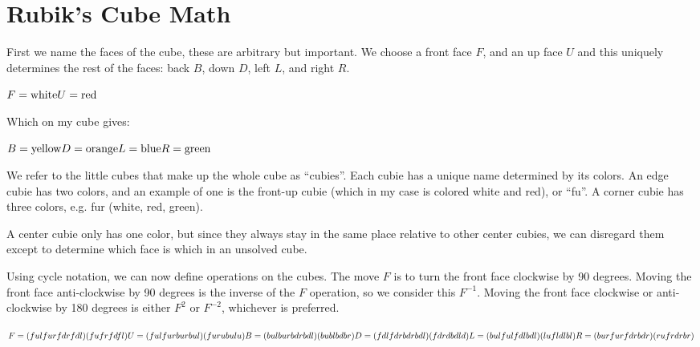 \chapter{Rubik's Cube Math}

First we name the faces of the cube, these are arbitrary but
important.  We choose a front face $F$, and an up face $U$ and this
uniquely determines the rest of the faces: back $B$, down $D$, left
$L$, and right $R$.

\begin{math}
  F = \text{white} \\
  U = \text{red} \\
\end{math}

Which on my cube gives:

\begin{math}
  B = \text{yellow} \\
  D = \text{orange} \\
  L = \text{blue} \\
  R = \text{green} \\
\end{math}

We refer to the little cubes that make up the whole cube as
``cubies''.  Each cubie has a unique name determined by its colors.
An edge cubie has two colors, and an example of one is the front-up
cubie (which in my case is colored white and red), or ``fu''.  A
corner cubie has three colors, e.g. fur (white, red, green).  

A center cubie only has one color, but since they always stay in the
same place relative to other center cubies, we can disregard them
except to determine which face is which in an unsolved cube.

Using cycle notation, we can now define operations on the cubes.  The
move $F$ is to turn the front face clockwise by 90 degrees.  Moving
the front face anti-clockwise by 90 degrees is the inverse of the $F$
operation, so we consider this $F^{-1}$.  Moving the front face
clockwise or anti-clockwise by 180 degrees is either $F^2$ or
$F^{-2}$, whichever is preferred.

\begin{math}
  F = (ful fur fdr fdl) (fu fr fd fl) \\
  U = (ful fur bur bul) (fu ru bu lu) \\
  B = (bul bur bdr bdl) (bu bl bd br) \\
  D = (fdl fdr bdr bdl) (fd rd bd ld) \\
  L = (bul ful fdl bdl) (lu fl dl bl) \\
  R = (bur fur fdr bdr) (ru fr dr br) \\
\end{math}
  

